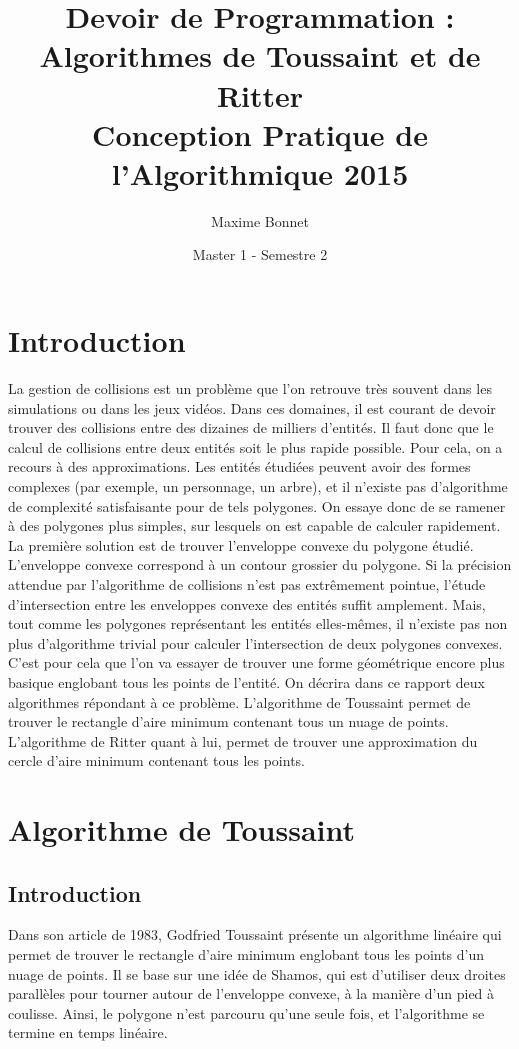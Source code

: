 \documentclass[11pt]{report}
\title{
{Devoir de Programmation : Algorithmes de Toussaint et de Ritter}\\
{Conception Pratique de l'Algorithmique 2015}
}
\author{Maxime Bonnet}
\date{Master 1 - Semestre 2}
\begin{document}
\maketitle

\tableofcontents
\chapter{Introduction}
La gestion de collisions est un problème que l'on retrouve très souvent dans les simulations ou dans les jeux vidéos. Dans ces domaines, il est courant de devoir trouver des collisions entre des dizaines de milliers d'entités. Il faut donc que le calcul de collisions entre deux entités soit le plus rapide possible. Pour cela, on a recours à des approximations. Les entités étudiées peuvent avoir des formes complexes (par exemple, un personnage, un arbre), et il n'existe pas d'algorithme de complexité satisfaisante pour de tels polygones. On essaye donc de se ramener à des polygones plus simples, sur lesquels on est capable de calculer rapidement. La première solution est de trouver l'enveloppe convexe du polygone étudié. L'enveloppe convexe correspond à un contour grossier du polygone. Si la précision attendue par l'algorithme de collisions n'est pas extrêmement pointue, l'étude d'intersection entre les enveloppes convexe des entités suffit amplement. Mais, tout comme les polygones représentant les entités elles-mêmes, il n'existe pas non plus d'algorithme trivial pour calculer l'intersection de deux polygones convexes. C'est pour cela que l'on va essayer de trouver une forme géométrique encore plus basique englobant tous les points de l'entité. On décrira dans ce rapport deux algorithmes répondant à ce problème. L'algorithme de Toussaint permet de trouver le rectangle d'aire minimum contenant tous un nuage de points. L'algorithme de Ritter quant à lui, permet de trouver une approximation du cercle d'aire minimum contenant tous les points.
\chapter{Algorithme de Toussaint}
\section{Introduction}
Dans son article de 1983, Godfried Toussaint présente un algorithme linéaire qui permet de trouver le rectangle d'aire minimum englobant tous les points d'un nuage de points. Il se base sur une idée de Shamos, qui est d'utiliser deux droites parallèles pour tourner autour de l'enveloppe convexe, à la manière d'un pied à coulisse. Ainsi, le polygone n'est parcouru qu'une seule fois, et l'algorithme se termine en temps linéaire.
\end{document}

